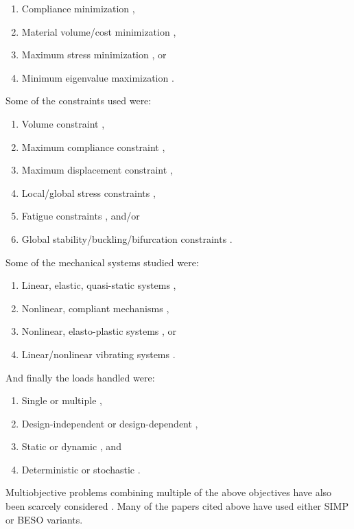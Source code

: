 \begin{enumerate}[label=(\arabic*)]
  \item Compliance minimization \citep{Bendsoe1989}, 
  \item Material volume/cost minimization \citep{Payten1998,Bruggi2012}, 
  \item Maximum stress minimization \citep{Yang1996,Lian2017}, or 
  \item Minimum eigenvalue maximization \citep{Neves1995,Rahmatalla2003,Munk2017}. 
\end{enumerate}
Some of the constraints used were: 
\begin{enumerate}[label=(\arabic*)]
  \item Volume constraint \citep{Bendsoe1989}, 
  \item Maximum compliance constraint \citep{Bruggi2012,Collet2017}, 
  \item Maximum displacement constraint \citep{Huang2010a}, 
  \item Local/global stress constraints \citep{Payten1998,Amir2017}, 
  \item Fatigue constraints \citep{Oest2017,Collet2017}, and/or 
  \item Global stability/buckling/bifurcation constraints \citep{Kocvara2004,Browne2013,Deng2017}.
\end{enumerate}
Some of the mechanical systems studied were: 
\begin{enumerate}[label=(\arabic*)]
  \item Linear, elastic, quasi-static systems \citep{Bendsoe1989}, 
  \item Nonlinear, compliant mechanisms \citep{Sigmund1997}, 
  \item Nonlinear, elasto-plastic systems \citep{Maute1997,Amir2017}, or 
  \item Linear/nonlinear vibrating systems \citep{Zargham2016}. 
\end{enumerate}
And finally the loads handled were: 
\begin{enumerate}[label=(\arabic*)]
  \item Single or multiple \citep{Allaire2004}, 
  \item Design-independent or design-dependent \citep{Lee2012},
  \item Static or dynamic \citep{Zhang2016}, and 
  \item Deterministic or stochastic \citep{Zhang2016}. 
\end{enumerate}
Multiobjective problems combining multiple of the above objectives have also been scarcely considered \citep{Suresh2010,Sato2017a}. Many of the papers cited above have used either SIMP or BESO variants.

